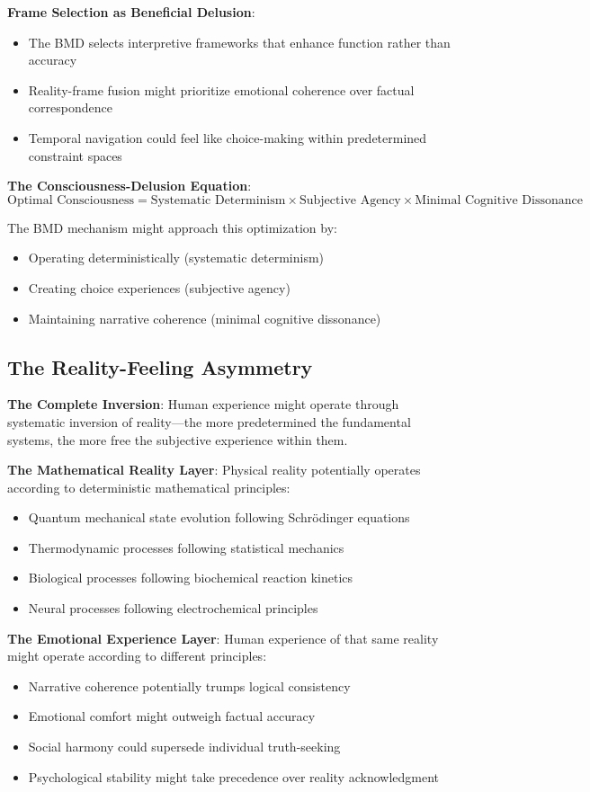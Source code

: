 \documentclass[12pt]{article}
\begin{document}
\textbf{Frame Selection as Beneficial Delusion}:
\begin{itemize}
\item The BMD selects interpretive frameworks that enhance function rather than accuracy
\item Reality-frame fusion might prioritize emotional coherence over factual correspondence
\item Temporal navigation could feel like choice-making within predetermined constraint spaces
\end{itemize}

\textbf{The Consciousness-Delusion Equation}:
$$\text{Optimal Consciousness} = \text{Systematic Determinism} \times \text{Subjective Agency} \times \text{Minimal Cognitive Dissonance}$$

The BMD mechanism might approach this optimization by:
\begin{itemize}
\item Operating deterministically (systematic determinism)
\item Creating choice experiences (subjective agency)
\item Maintaining narrative coherence (minimal cognitive dissonance)
\end{itemize}

\subsection{The Reality-Feeling Asymmetry}

\textbf{The Complete Inversion}: Human experience might operate through systematic inversion of reality—the more predetermined the fundamental systems, the more free the subjective experience within them.

\textbf{The Mathematical Reality Layer}:
Physical reality potentially operates according to deterministic mathematical principles:
\begin{itemize}
\item Quantum mechanical state evolution following Schrödinger equations
\item Thermodynamic processes following statistical mechanics
\item Biological processes following biochemical reaction kinetics
\item Neural processes following electrochemical principles
\end{itemize}

\textbf{The Emotional Experience Layer}:
Human experience of that same reality might operate according to different principles:
\begin{itemize}
\item Narrative coherence potentially trumps logical consistency
\item Emotional comfort might outweigh factual accuracy
\item Social harmony could supersede individual truth-seeking
\item Psychological stability might take precedence over reality acknowledgment
\end{itemize}
\end{document}
